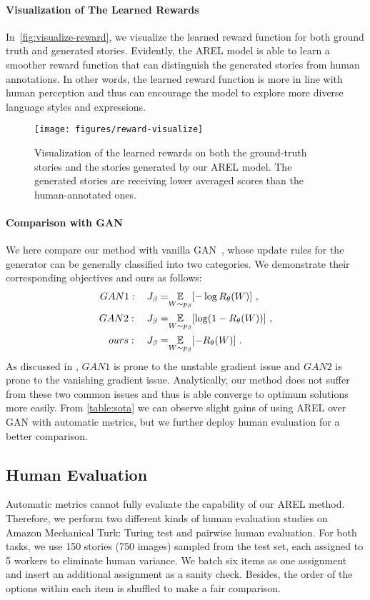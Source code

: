 \documentclass[11pt,a4paper]{article}
\newcommand{\expect}[1]{\ensuremath{\underset{#1}{\mathbb{E}}\xspace}}
\begin{document}
\paragraph{Visualization of The Learned Rewards}
In~\autoref{fig:visualize-reward}, we visualize the learned reward function for both ground truth and generated stories. Evidently, the AREL model is able to learn a smoother reward function that can distinguish the generated stories from human annotations. In other words, the learned reward function is more in line with human perception and thus can encourage the model to explore more diverse language styles and expressions.   

\begin{figure}
\centering
\texttt{[image: figures/reward-visualize]}  
\vspace*{-1ex}
\caption{Visualization of the learned rewards on both the ground-truth stories and the stories generated by our AREL model. The generated stories are receiving lower averaged scores than the human-annotated ones.}
\label{fig:visualize-reward}
\end{figure}

\paragraph{Comparison with GAN}
We here compare our method with vanilla GAN~\cite{goodfellow2014generative}, whose update rules for the generator can be generally classified into two categories. We demonstrate their corresponding objectives and ours as follows:
\begin{align*}
\small
GAN1: \quad J_{\beta} =& \expect{W \sim p_{\beta}}[-\log R_{\theta}(W)] ~, \\
GAN2: \quad J_{\beta} =& \expect{W \sim p_{\beta}}[\log (1 - R_{\theta}(W))] ~, \\
ours: \quad J_{\beta} =& \expect{W \sim p_{\beta}}[- R_{\theta}(W)] ~.
\end{align*}
As discussed in \citet{arjovsky2017wasserstein}, $GAN1$ is prone to the unstable gradient issue and $GAN2$ is prone to the vanishing gradient issue. Analytically, our method does not suffer from these two common issues and thus is able converge to optimum solutions more easily. From \autoref{table:sota} we can observe slight gains of using AREL over GAN with automatic metrics, but we further deploy human evaluation for a better comparison. 

\subsection{Human Evaluation}
\label{sec:human}
Automatic metrics cannot fully evaluate the capability of our AREL method. Therefore, we perform two different kinds of human evaluation studies on Amazon Mechanical Turk: Turing test and pairwise human evaluation. For both tasks, we use 150 stories (750 images) sampled from the test set, each assigned to 5 workers to eliminate human variance. We batch six items as one assignment and insert an additional assignment as a sanity check. Besides, the order of the options within each item is shuffled to make a fair comparison.
\end{document}
